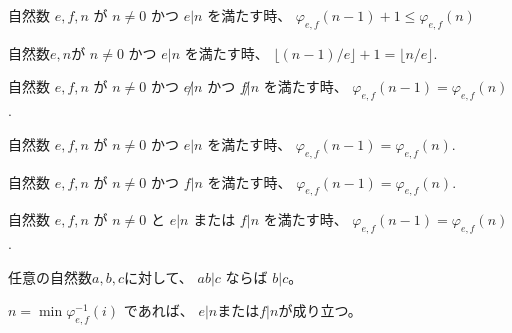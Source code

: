 \begin{lemma}
\label{lm:φ_n_minus_one_eq_φ_n}
\leanok
自然数
$
e,f,n
$
が
$
n \ne 0
$
かつ
$
e | n
$
を満たす時、
$
\varphi_{e,f}(n-1) + 1 \le \varphi_{e,f}(n)
$
\end{lemma}

\begin{lemma}
\label{lm:dvd_mod_ne}
\leanok
自然数$e,n$が
$n \ne 0$
かつ
$e | n$
を満たす時、
$\lfloor (n-1) / e \rfloor + 1 = \lfloor n / e \rfloor$.
\end{lemma}

\begin{lemma}
\label{eq:φ_n_minus_one_eq_φ_n}
\leanok
自然数
$
e, f, n
$
が
$
n \ne 0
$
かつ
$
e \not | n
$
かつ
$
f \not | n
$
を満たす時、
$
\varphi_{e,f}(n-1) = \varphi_{e,f}(n)
$.
\end{lemma}

\begin{lemma}
\label{lm:φ_n_minus_one_ne_φ_n_e}
\leanok
自然数
$
e, f, n
$
が
$
n \ne 0
$
かつ
$
e | n
$
を満たす時、
$
\varphi_{e,f}(n-1) = \varphi_{e,f}(n)
$.
\end{lemma}

\begin{lemma}
\label{lm:φ_n_minus_one_ne_φ_n_f}
\leanok
自然数
$
e, f, n
$
が
$
n \ne 0
$
かつ
$
f | n
$
を満たす時、
$
\varphi_{e,f}(n-1) = \varphi_{e,f}(n)
$.
\end{lemma}

\begin{lemma}
\label{eq:φ_n_minus_one_ne_φ_n}
\leanok
自然数
$
e, f, n
$
が
$
n \ne 0
$
と
$
e | n
$
または
$
f | n
$
を満たす時、
$
\varphi_{e,f}(n-1) = \varphi_{e,f}(n)
$.
\end{lemma}

\begin{lemma}
\label{lm:nat_mul_dvd}
\leanok
任意の自然数$a,b,c$に対して、
$
ab | c
$
ならば
$
b | c
$。
\end{lemma}

\begin{lemma}
\label{lm:min_φinv_dvd}
\leanok
$n = \min \varphi_{e,f}^{-1}(i)$
であれば、
$e | n$または$f | n$が成り立つ。
\end{lemma}

